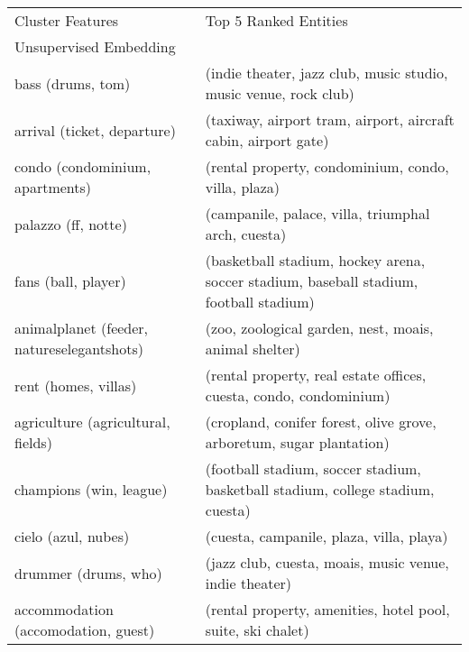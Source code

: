 \begin{table}[]
	\scriptsize
	\begin{tabular}{ll}
		Cluster Features                           & Top 5 Ranked Entities                                                                  \\
		Unsupervised Embedding                     &                                                                                        \\
		bass (drums, tom)                          & (indie theater, jazz club, music studio, music venue, rock club)                       \\
		arrival (ticket, departure)                & (taxiway, airport tram, airport, aircraft cabin, airport gate)                         \\
		condo (condominium, apartments)            & (rental property, condominium, condo, villa, plaza)                                    \\
		palazzo (ff, notte)                        & (campanile, palace, villa, triumphal arch, cuesta)                                     \\
		fans (ball, player)                        & (basketball stadium, hockey arena, soccer stadium, baseball stadium, football stadium) \\
		animalplanet (feeder, natureselegantshots) & (zoo, zoological garden, nest, moais, animal shelter)                                  \\
		rent (homes, villas)                       & (rental property, real estate offices, cuesta, condo, condominium)                     \\
		agriculture (agricultural, fields)         & (cropland, conifer forest, olive grove, arboretum, sugar plantation)                   \\
		champions (win, league)                    & (football stadium, soccer stadium, basketball stadium, college stadium, cuesta)        \\
		cielo (azul, nubes)                        & (cuesta, campanile, plaza, villa, playa)                                               \\
		drummer (drums, who)                       & (jazz club, cuesta, moais, music venue, indie theater)                                 \\
		accommodation (accomodation, guest)        & (rental property, amenities, hotel pool, suite, ski chalet)                            \\

\end{tabular}
\end{table}
